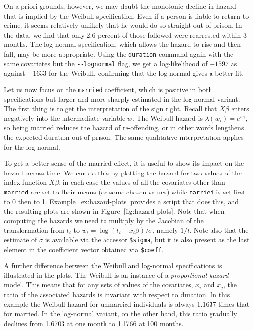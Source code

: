 On a priori grounds, however, we may doubt the monotonic decline in
hazard that is implied by the Weibull specification. Even if a person
is liable to return to crime, it seems relatively unlikely that he
would do so straight out of prison. In the data, we find that only 2.6
percent of those followed were rearrested within 3 months. The
log-normal specification, which allows the hazard to rise and then
fall, may be more appropriate.  Using the \texttt{duration} command
again with the same covariates but the \verb|--lognormal| flag, we get
a log-likelihood of $-1597$ as against $-1633$ for the Weibull,
confirming that the log-normal gives a better fit.

Let us now focus on the \texttt{married} coefficient, which is
positive in both specifications but larger and more sharply estimated
in the log-normal variant. The first thing is to get the
interpretation of the sign right.  Recall that $X\beta$ enters
negatively into the intermediate variable $w$. The Weibull hazard is 
$\lambda(w_i) = e^{w_i}$, so being married reduces the hazard of
re-offending, or in other words lengthens the expected duration out of
prison.  The same qualitative interpretation applies for the
log-normal.  

To get a better sense of the married effect, it is useful to show its
impact on the hazard across time. We can do this by plotting the
hazard for two values of the index function $X\beta$: in each case the
values of all the covariates other than \texttt{married} are set to
their means (or some chosen values) while \texttt{married} is set
first to 0 then to 1. Example~\ref{ex:hazard-plots} provides a script
that does this, and the resulting plots are shown in
Figure~\ref{fig:hazard-plots}. Note that when computing the hazards we
need to multiply by the Jacobian of the transformation from $t_i$ to
$w_i = \log (t_i - x_i\beta)/\sigma$, namely $1/t$.  Note also that
the estimate of $\sigma$ is available via the accessor \verb|$sigma|,
but it is also present as the last element in the coefficient vector
obtained via \verb|$coeff|.

A further difference between the Weibull and log-normal specifications
is illustrated in the plots. The Weibull is an instance of a
\emph{proportional hazard} model. This means that for any sets of
values of the covariates, $x_i$ and $x_j$, the ratio of the associated
hazards is invariant with respect to duration. In this example the
Weibull hazard for unmarried individuals is always 1.1637 times that
for married. In the log-normal variant, on the other hand, this ratio
gradually declines from 1.6703 at one month to 1.1766 at 100 months.


